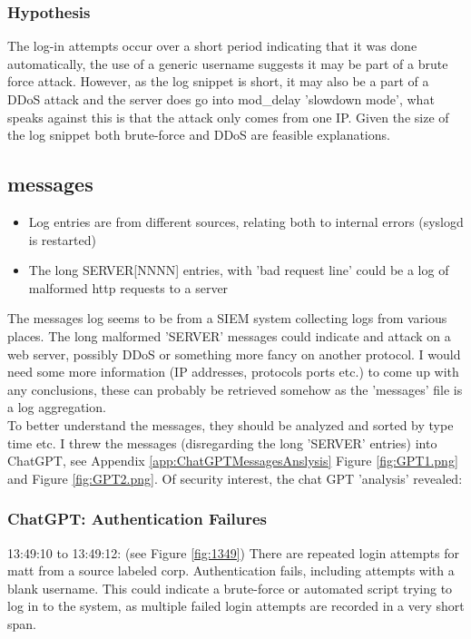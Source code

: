 \documentclass[
	letterpaper, %
	10pt, %
	unnumberedsections, %
	twoside, %
]{APAAssignment}
\begin{document}
\subsubsection{Hypothesis}
The log-in attempts occur over a short period indicating that it was done automatically, the use of a generic username suggests it may be part of a brute force attack. However, as the log snippet is short, it may also be a part of a DDoS attack and the server does go into mod\_delay 'slowdown mode', what speaks against this is that the attack only comes from one IP. Given the size of the log snippet both brute-force and DDoS are feasible explanations. 

\subsection{messages}
\begin{itemize}
	\item Log entries are from different sources, relating both to internal errors (syslogd is restarted) 
	\item The long SERVER[NNNN] entries, with 'bad request line' could be a log of malformed http requests to a server
\end{itemize}


The messages log seems to be from a SIEM system collecting logs from various places.
The long malformed 'SERVER' messages could indicate and attack on a web server, possibly DDoS or something more fancy on another protocol. I would need some more information (IP addresses, protocols ports etc.) to come up with any conclusions, these can probably be retrieved somehow as the 'messages' file is a log aggregation. \\ 
To better understand the messages, they should be analyzed and sorted by type time etc. I threw the messages (disregarding the long 'SERVER' entries) into ChatGPT, see Appendix \ref{app:ChatGPTMessagesAnslysis} Figure \ref{fig:GPT1.png} and Figure \ref{fig:GPT2.png}. Of security interest, the chat GPT 'analysis' revealed: 

\subsubsection{ChatGPT: Authentication Failures} 13:49:10 to 13:49:12: (see Figure \ref{fig:1349}) There are repeated login attempts for matt from a source labeled corp. Authentication fails,  including attempts with a blank username. This could indicate a brute-force or automated script trying to log in to the system, as multiple failed login attempts are recorded in a very short span. \\
\end{document}
